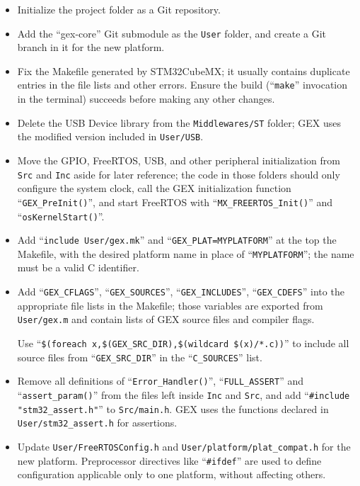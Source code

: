 \begin{itemize}	
	\item Initialize the project folder as a Git repository.
	
	\item Add the ``gex-core'' Git submodule as the \verb|User| folder, and create a Git branch in it for the new platform.
	
	\item Fix the Makefile generated by STM32CubeMX; it usually contains duplicate entries in the file lists and other errors. Ensure the build (``\verb|make|'' invocation in the terminal) succeeds before making any other changes.
	
	\item Delete the USB Device library from the \verb|Middlewares/ST| folder; GEX uses the modified version included in \verb|User/USB|.
	
	\item Move the \gls{GPIO}, FreeRTOS, USB, and other peripheral initialization from \verb|Src| and \verb|Inc| aside for later reference; the code in those folders should only configure the system clock, call the GEX initialization function ``\verb|GEX_PreInit()|'', and start FreeRTOS with ``\verb|MX_FREERTOS_Init()|'' and ``\verb|osKernelStart()|''.
	
	\item Add ``\verb|include User/gex.mk|'' and ``\verb|GEX_PLAT=MYPLATFORM|'' at the top the Makefile, with the desired platform name in place of ``\verb|MYPLATFORM|''; the name must be a valid C identifier.
	
	\item Add ``\verb|GEX_CFLAGS|'', ``\verb|GEX_SOURCES|'', ``\verb|GEX_INCLUDES|'', ``\verb|GEX_CDEFS|'' into the appropriate file lists in the Makefile; those variables are exported from \verb|User/gex.m| and contain lists of GEX source files and compiler flags.
	
	Use ``\verb|$(foreach x,$(GEX_SRC_DIR),$(wildcard $(x)/*.c))|'' to include all source files from ``\verb|GEX_SRC_DIR|'' in the ``\verb|C_SOURCES|'' list.
	
	\item Remove all definitions of ``\verb|Error_Handler()|'', ``\verb|FULL_ASSERT|'' and ``\verb|assert_param()|'' from the files left inside \verb|Inc| and \verb|Src|, and add ``\verb|#include "stm32_assert.h"|'' to \verb|Src/main.h|. GEX uses the functions declared in \verb|User/stm32_assert.h| for assertions.
	
	\item Update \verb|User/FreeRTOSConfig.h| and \verb|User/platform/plat_compat.h| for the new platform. Preprocessor directives like ``\verb|#ifdef|'' are used to define configuration applicable only to one platform, without affecting others.
	

\end{itemize}

